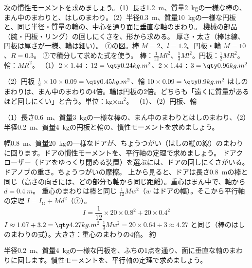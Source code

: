 \begin{phreidai}[棒・円板・輪の慣性モーメント]
\label{ph:力-6:ex2}次の慣性モーメントを求めましょう。（1）長さ\qty{1.2}{m}、質量\qty{2}{kg}の一様な棒の、まん中のまわりと、はしのまわり。（2）半径\qty{0.3}{m}、質量\qty{10}{kg}の一様な円板と、同じ半径・質量の輪の、中心を通り面に垂直な軸のまわり。
\phbamen
機械の部品（腕・円板・リング）の回しにくさを、形から求める。
\phmushi
厚さ・太さ（棒は線、円板は厚さが一様、輪は細い）。
\phzu
⑦の図。棒 $M=2$、$l=1.2$。円板・輪 $M=10$、$R=0.3$。
\phriyu
⑦で積分して求めた式を使う。
\phtateru
棒：$\tfrac{1}{12}Ml^2$、$\tfrac{1}{3}Ml^2$。円板：$\tfrac{1}{2}MR^2$。輪：$MR^2$。
\phtoku
（1）$2\times1.44\div12=\pxgI{0.24}$、$2\times1.44\div3=\pxgI{0.96}$\par
（2）円板 $\tfrac{1}{2}\times10\times0.09=\pxgI{0.45}$、輪 $10\times0.09=\pxgI{0.9}$
\phtashikame
はしのまわりは、まん中のまわりの4倍。輪は円板の2倍。どちらも「遠くに質量があるほど回しにくい」と合う。\quad 単位：kg×m$^2$。
\kotae （1）、\quad（2）円板、輪
\end{phreidai}
\begin{jibun}
（1）長さ\qty{0.6}{m}、質量\qty{3}{kg}の一様な棒の、まん中のまわりとはしのまわり、（2）半径\qty{0.2}{m}、質量\qty{4}{kg}の円板と輪の、慣性モーメントを求めましょう。
\end{jibun}

\begin{phreidai}[ドアの慣性モーメント]
\label{ph:力-6:ex3}幅\qty{0.8}{m}、質量\qty{20}{kg}の一様なドアが、ちょうつがい（はしの縦の線）のまわりに回ります。ドアの慣性モーメントを、平行軸の定理で求めましょう。
\phbamen
ドアクローザー（ドアをゆっくり閉める装置）を選ぶには、ドアの回しにくさがいる。
\phmushi
ドアノブの重さ。ちょうつがいの摩擦。
\phzu
上から見ると、ドアは長さ\qty{0.8}{m}の棒と同じ（高さの向きには、どの部分も軸から同じ距離）。重心はまん中で、軸から $d=\qty{0.4}{m}$。
\phriyu
重心のまわりは棒と同じ $\tfrac{1}{12}Mw^2$（$w$ はドアの幅）。そこから平行軸の定理 $I=I_{\mathrm G}+Md^2$（⑦）。
\phtateru
\[ I=\frac{1}{12}\times20\times0.8^2+20\times0.4^2 \]
\phtoku
$I\approx1.07+3.2=\pxgI{4.27}$
\phtashikame
$\tfrac{1}{3}Mw^2=20\times0.64\div3\approx4.27$ と同じ（棒のはしのまわりの式）。\quad 大きさ：重心のまわりの4倍。
\kotae 約
\end{phreidai}
\begin{jibun}
半径\qty{0.2}{m}、質量\qty{4}{kg}の一様な円板を、ふちの1点を通り、面に垂直な軸のまわりに回します。慣性モーメントを、平行軸の定理で求めましょう。
\end{jibun}

